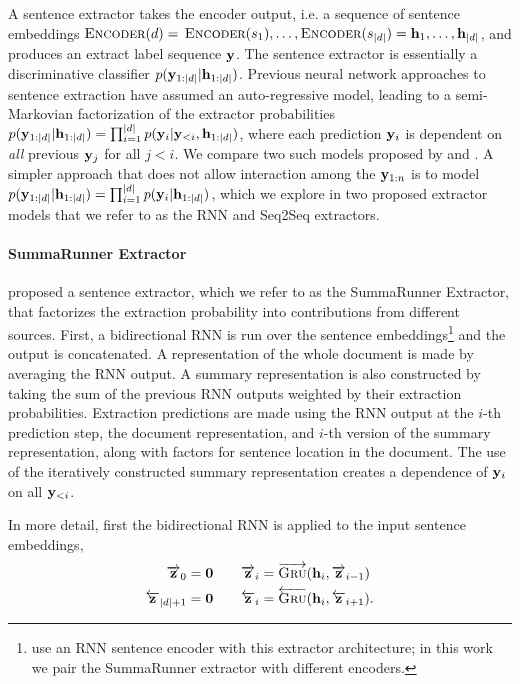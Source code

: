 A sentence extractor takes the encoder output, i.e. 
a sequence of sentence embeddings
$\textsc{Encoder}(d) =$ $\textsc{Encoder}(s_1), \ldots, \textsc{Encoder}(s_{|d|}) =
\mathbf{h}_1, \ldots, \mathbf{h}_{|d|}$, and produces an extract label sequence
$\mathbf{y}$. 
The sentence extractor is essentially a discriminative
classifier $p(\mathbf{y}_{1:| d |} | \mathbf{h}_{1:| d |})$.
Previous neural network approaches to sentence extraction have assumed
an auto-regressive model, leading to a semi-Markovian
factorization of the extractor probabilities
$p(\mathbf{y}_{1:| d |} | \mathbf{h}_{1:| d |})=\prod_{i=1}^{|d|} 
p(\mathbf{y}_i|\mathbf{y}_{<i},\mathbf{h}_{1:| d |})$,
where each prediction $\mathbf{y}_i$ is dependent on \emph{all}
previous $\mathbf{y}_j$ for
all $j < i$. We compare two such models proposed by \cite{cheng2016neural}
and \cite{nallapati2016summarunner}.
A simpler approach that does not allow interaction among the $\mathbf{y}_{1:n}$
is to
model $p(\mathbf{y}_{1:| d |}|\mathbf{h}_{1:| d |}) = 
\prod_{i=1}^{| d |} p(\mathbf{y}_i|\mathbf{h}_{1:| d |})$,
  which we explore in two proposed extractor models that we refer to as the RNN 
  and Seq2Seq extractors.

\paragraph{SummaRunner Extractor}\citet{nallapati2016summarunner} proposed
a sentence extractor, which we refer to as the SummaRunner Extractor,
that factorizes the extraction probability into contributions 
from different sources.
First, a bidirectional RNN is run over the sentence embeddings\footnote{\citet{nallapati2016summarunner}
    use an RNN sentence encoder with 
this extractor architecture; in this work we pair the SummaRunner extractor
with different encoders. } and the output is
concatenated. A representation of the whole document is made by 
averaging the RNN output. A summary representation is also constructed 
by taking the sum of the previous RNN outputs weighted by their extraction
probabilities. Extraction predictions are made using 
the RNN output at the $i$-th prediction step, the document representation, and 
$i$-th version of the summary representation, along with factors for 
sentence location in the document. The use of the iteratively constructed
summary representation creates a dependence of $\mathbf{y}_i$ on all 
$\mathbf{y}_{<i}$.


In more detail, first the bidirectional RNN is applied to the input 
sentence embeddings,
\begin{align}
    \overrightarrow{\mathbf{z}}_0 = \textbf{0}&\quad \quad \overrightarrow{\mathbf{z}}_i = \overrightarrow{\textsc{Gru}}(\mathbf{h}_i, \overrightarrow{\mathbf{z}}_{i-1}) \\
    \overleftarrow{\mathbf{z}}_{| d | + 1} = \textbf{0}& \quad \quad \overleftarrow{\mathbf{z}}_i = \overleftarrow{\textsc{Gru}}(\mathbf{h}_i, \overleftarrow{\mathbf{z}}_{i+1}).
\end{align}

